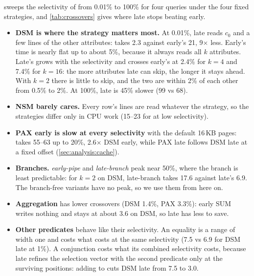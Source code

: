 \begin{table}[t]
\centering
\caption{Selectivity at which late stops beating early, log-interpolated between measured
points.}
\label{tab:crossovers}
\end{table}

 sweeps the selectivity of  from 0.01\% to 100\% for four
queries under the four fixed strategies, and \cref{tab:crossovers} gives where late stops
beating early.
\begin{itemize}
\item \textbf{DSM is where the strategy matters most.} At 0.01\%, late reads $c_0$ and a few
lines of the other attributes:  takes 2.3\ms{} against early's 21\ms, 9$\times$
less. Early's time is nearly flat up to about 5\%, because it always reads all $k$ attributes.
Late's grows with the selectivity and crosses early's at 2.4\% for $k{=}4$ and 7.4\% for
$k{=}16$: the more attributes late can skip, the longer it stays ahead. With $k{=}2$ there is
little to skip, and the two are within 2\% of each other from 0.5\% to 2\%. At 100\%, late is
45\% slower (99 vs 68\ms).
\item \textbf{NSM barely cares.} Every row's lines are read whatever the strategy, so the
strategies differ only in CPU work (15--23\ms{} for  at low selectivity).
\item \textbf{PAX early is slow at every selectivity} with the default 16\,KB pages:
 takes 55--63\ms{} up to 20\%, 2.6$\times$ DSM early, while PAX late follows DSM
late at a fixed offset (\cref{sec:analysis:cache}).
\item \textbf{Branches.} \emph{early-pipe} and \emph{late-branch} peak near 50\%, where the
branch is least predictable: for $k{=}2$ on DSM, late-branch takes 17.6\ms{} against late's
6.9\ms. The branch-free variants have no peak, so we use them from here on.
\item \textbf{Aggregation} has lower crossovers (DSM 1.4\%, PAX 3.3\%): early SUM writes
nothing and stays at about 3.6\ms{} on DSM, so late has less to save.
\item \textbf{Other predicates} behave like their selectivity. An equality is a range of width
one and costs what  costs at the same selectivity (7.5 vs 6.9\ms{} for DSM late
 at 1\%). A conjunction costs what its combined selectivity costs, because late
refines the selection vector with the second predicate only at the surviving positions: adding
 to  cuts DSM late from 7.5 to 3.0\ms.
\end{itemize}

